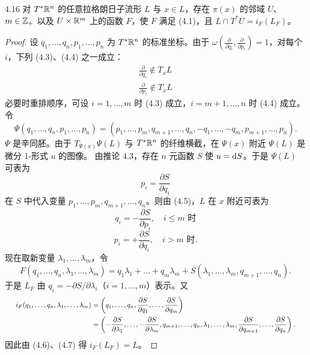\begin{theorem*}{4.16}
  对 $T^*\mathbb{R}^n$ 的任意拉格朗日子流形 $L$ 与 $x\in L$，存在 $\pi(x)$ 的邻域 $U$、$m\in\mathbb{Z}_+$ 以及 $U\times\mathbb{R}^m$ 上的函数 $F$，使 $F$ 满足 (4.1)，且 $L\cap T^*U=i_F(L_F)$。
\end{theorem*}
\begin{proof}
  设 $q_1,\dots,q_n,p_1,\dots,p_n$ 为 $T^*\mathbb{R}^n$ 的标准坐标。由于 $\omega(\frac{\partial}{\partial q_i},\frac{\partial}{\partial p_i})=1$，对每个 $i$，下列 (4.3)、(4.4) 之一成立：
  \begin{align}
    \frac{\partial}{\partial q_i}\notin T_xL \tag{4.3}\\
    \frac{\partial}{\partial p_i}\notin T_xL \tag{4.4}
  \end{align}
  必要时重排顺序，可设 $i=1,\dots,m$ 时 (4.3) 成立，$i=m+1,\dots,n$ 时 (4.4) 成立。令
  \[
    \Psi(q_1,\dots,q_n,p_1,\dots,p_n)=(p_1,\dots,p_m,q_{m+1},\dots,q_n,-q_1,\dots,-q_m,p_{m+1},\dots,p_n).
  \]
  $\Psi$ 是辛同胚。由于 $T_{\Psi(x)}\Psi(L)$ 与 $T^*\mathbb{R}^n$ 的纤维横截，在 $\Psi(x)$ 附近 $\Psi(L)$ 是微分 1-形式 $u$ 的图像。
  由推论 4.3，存在 $n$ 元函数 $S$ 使 $u=\mathrm{d} S$。于是 $\Psi(L)$ 可表为
  \begin{equation}
    p_i=\frac{\partial S}{\partial q_i} \tag{4.5}
  \end{equation}
  在 $S$ 中代入变量 $p_1,\dots,p_m,q_{m+1},\dots,q_n$。则由 (4.5)，$L$ 在 $x$ 附近可表为
  \begin{equation}
    q_i=-\frac{\partial S}{\partial p_i},\quad i\le m \text{ 时} \tag{4.6}
  \end{equation}
  \begin{equation}
    p_i=+\frac{\partial S}{\partial q_i},\quad i>m \text{ 时}. \tag{4.7}
  \end{equation}
  现在取新变量 $\lambda_1,\dots,\lambda_m$，令
  \[
    F(q_1,\dots,q_n,\lambda_1,\dots,\lambda_m)=q_1\lambda_1+\dots+q_m\lambda_m+S(\lambda_1,\dots,\lambda_m,q_{m+1},\dots,q_n).
  \]
  于是 $L_F$ 由 $q_i=-\partial S/\partial\lambda_i$（$i=1,\dots,m$）表示。又
\[
  \resizebox{0.97\linewidth}{!}{$\begin{aligned} i_F(q_1,\dots,q_n,\lambda_1,\dots,\lambda_m) &=\left(q_1,\dots,q_n,\frac{\partial S}{\partial q_1},\dots,\frac{\partial S}{\partial q_m}\right)\\ &=\left(-\frac{\partial S}{\partial\lambda_1},\dots,-\frac{\partial S}{\partial\lambda_m},q_{m+1},\dots,q_n,\lambda_1,\dots,\lambda_m,\frac{\partial S}{\partial q_{m+1}},\dots,\frac{\partial S}{\partial q_n}\right). \end{aligned}$}
\]
  因此由 (4.6)、(4.7) 得 $i_F(L_F)=L$。
\end{proof}

